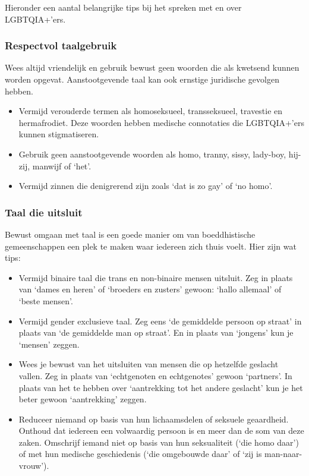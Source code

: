 \documentclass[12pt,openany]{book}
\begin{document}
Hieronder een aantal belangrijke tips bij het spreken met en over LGBTQIA+'ers.

\subsubsection*{Respectvol taalgebruik}

Wees altijd vriendelijk en gebruik bewust geen woorden die als kwetsend kunnen worden opgevat. Aanstootgevende taal kan ook ernstige juridische gevolgen hebben.

\begin{itemize}
  \setlength\itemsep{-0.3em}
  \item Vermijd verouderde termen als homoseksueel, transseksueel, travestie en hermafrodiet. Deze woorden hebben medische connotaties die LGBTQIA+'ers kunnen stigmatiseren.
  \item Gebruik geen aanstootgevende woorden als homo, tranny, sissy, lady-boy, hij-zij, manwijf of `het'.
  \item Vermijd zinnen die denigrerend zijn zoals `dat is zo gay' of `no homo'.
\end{itemize}

\subsubsection*{Taal die uitsluit}

Bewust omgaan met taal is een goede manier om van boeddhistische gemeenschappen een plek te maken waar iedereen zich thuis voelt.  Hier zijn wat tips:

\begin{itemize}
  \setlength\itemsep{-0.3em}
  \item Vermijd binaire taal die trans en non-binaire mensen uitsluit. Zeg in plaats van `dames en heren' of `broeders en zusters' gewoon: `hallo allemaal' of `beste mensen'.
  \item Vermijd gender exclusieve taal. Zeg eens `de gemiddelde persoon op straat' in plaats van `de gemiddelde man op straat'. En in plaats van `jongens' kun je `mensen' zeggen.
  \item Wees je bewust van het uitsluiten van mensen die op hetzelfde geslacht vallen. Zeg in plaats van `echtgenoten en echtgenotes' gewoon `partners'. In plaats van het te hebben over `aantrekking tot het andere geslacht' kun je het beter gewoon `aantrekking' zeggen.
\item Reduceer niemand op basis van hun lichaamsdelen of seksuele geaardheid. Onthoud dat iedereen een volwaardig persoon is en meer dan de som van deze zaken. Omschrijf iemand niet op basis van hun seksualiteit (`die homo daar') of met hun medische geschiedenis (`die omgebouwde daar' of `zij is man-naar-vrouw').
\end{itemize}
\end{document}
